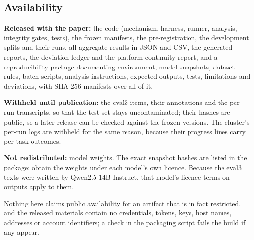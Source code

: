 \subsection{Availability}

\textbf{Released with the paper:} the code (mechanism, harness, runner, analysis, integrity gates, tests), the
frozen manifests, the pre-registration, the development splits and their runs, all aggregate results in JSON and
CSV, the generated reports, the deviation ledger and the platform-continuity report, and a reproducibility package
documenting environment, model snapshots, dataset rules, batch scripts, analysis instructions, expected outputs,
tests, limitations and deviations, with SHA-256 manifests over all of it.

\textbf{Withheld until publication:} the eval3 items, their annotations and the per-run transcripts, so that the
test set stays uncontaminated; their hashes are public, so a later release can be checked against the frozen
versions. The cluster's per-run logs are withheld for the same reason, because their progress lines carry per-task
outcomes.

\textbf{Not redistributed:} model weights. The exact snapshot hashes are listed in the package; obtain the weights
under each model's own licence. Because the eval3 texts were written by Qwen2.5-14B-Instruct, that model's licence
terms on outputs apply to them.

Nothing here claims public availability for an artifact that is in fact restricted, and the released materials
contain no credentials, tokens, keys, host names, addresses or account identifiers; a check in the packaging
script fails the build if any appear.
